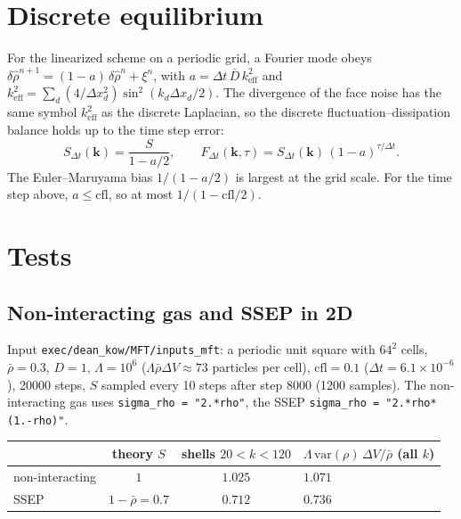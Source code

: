 \documentclass[11pt]{article}
\newcommand{\code}[1]{\texttt{#1}}
\newcommand{\keff}{k_{\mathrm{eff}}}
\begin{document}
\section{Discrete equilibrium}

For the linearized scheme on a periodic grid, a Fourier mode obeys
$\delta\hat\rho^{n+1} = (1-a)\,\delta\hat\rho^{n} + \xi^n$, with
$a = \Delta t\,\bar D\,\keff^2$ and
$\keff^2 = \sum_d (4/\Delta x_d^2)\sin^2(k_d\Delta x_d/2)$. The divergence of
the face noise has the same symbol $\keff^2$ as the discrete Laplacian, so
the discrete fluctuation--dissipation balance holds up to the time step
error:
\begin{equation}\label{eq:Sdt}
  S_{\Delta t}(\mathbf k) = \frac{S}{1-a/2},\qquad
  F_{\Delta t}(\mathbf k,\tau) = S_{\Delta t}(\mathbf k)\,(1-a)^{\tau/\Delta t}.
\end{equation}
The Euler--Maruyama bias $1/(1-a/2)$ is largest at the grid scale. For the
time step above, $a\le\mathrm{cfl}$, so at most $1/(1-\mathrm{cfl}/2)$.

\section{Tests}

\subsection{Non-interacting gas and SSEP in 2D}

Input \code{exec/dean\_kow/MFT/inputs\_mft}: a periodic unit square with
$64^2$ cells, $\bar\rho=0.3$, $D=1$, $\Lambda=10^6$ ($\Lambda\bar\rho\Delta V\approx73$
particles per cell), $\mathrm{cfl}=0.1$ ($\Delta t=6.1\times10^{-6}$),
20000 steps, $S$ sampled every 10 steps after step 8000 (1200 samples).
The non-interacting gas uses \code{sigma\_rho = "2.*rho"}, the SSEP
\code{sigma\_rho = "2.*rho*(1.-rho)"}.

\begin{center}
\begin{tabularx}{\linewidth}{lccL}
\toprule
 & theory $S$ & shells $20<k<120$ & $\Lambda\,\mathrm{var}(\rho)\,\Delta V/\bar\rho$ (all $k$) \\
\midrule
non-interacting & $1$ & $1.025$ & $1.071$ \\
SSEP & $1-\bar\rho=0.7$ & $0.712$ & $0.736$ \\
\bottomrule
\end{tabularx}
\end{center}
\end{document}
